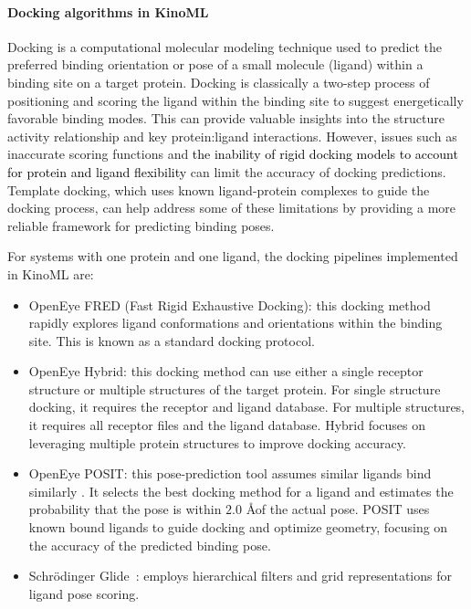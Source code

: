 \documentclass[9pt,lessons, pubversion]{livecoms}
\newcommand{\revision}[1]{\textcolor{black}{#1}}
\begin{document}
\paragraph{Docking algorithms in KinoML} Docking is a computational molecular modeling technique used to predict the preferred binding orientation or pose of a small molecule (ligand) within a binding site on a target protein. \cite{morris2008molecular} Docking is classically a two-step process of positioning and scoring the ligand within the binding site to suggest energetically favorable binding mode\revision{s}. This can provide valuable insights into the structure activity relationship and key protein:ligand interactions. However, issues such as inaccurate scoring functions and \revision{the inability of rigid docking models to account for protein and ligand flexibility} can limit the accuracy of docking predictions. \cite{forli2016computational} Template docking, which uses known ligand-protein complexes to guide the docking process, can help address some of these limitations by providing a more reliable framework for predicting binding poses. \cite{schaller2023benchmarking}

For systems with one protein and one ligand, the docking pipelines implemented in KinoML are: 
\begin{itemize}
    \item OpenEye FRED (Fast Rigid Exhaustive Docking): this docking method rapidly explores ligand conformations and orientations within the binding site. This is known as a standard docking protocol.
    \item OpenEye Hybrid: this docking method can use either a single receptor structure or multiple structures of the target protein. For single structure docking, it requires the receptor and ligand database. For multiple structures, it requires all receptor files and the ligand database. Hybrid focuses on leveraging multiple protein structures to improve docking accuracy.
    \item OpenEye POSIT: this pose-prediction tool assumes similar ligands bind similarly \cite{posit}. It selects the best docking method for a ligand and estimates the probability that the pose is within $2.0$ \AA \space of the actual pose. POSIT uses known bound ligands to guide docking and optimize geometry, focusing on the accuracy of the predicted binding pose.
    \item Schrödinger Glide~\cite{friesner2006extra}: employs hierarchical filters and grid representations for ligand pose scoring.
\end{itemize}
\end{document}
